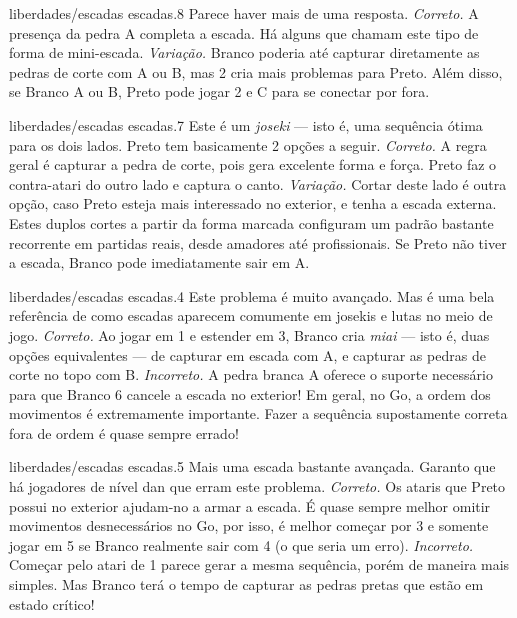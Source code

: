 \problemAnswerDiagram
  {liberdades/escadas}
  {escadas.8}
  {Parece haver mais de uma resposta.}
  {\emph{Correto.} A presença da pedra A completa a escada. Há alguns que chamam este tipo de forma de mini-escada.}
  {\emph{Variação.} Branco poderia até capturar diretamente as pedras de corte com A ou B, mas 2 cria mais problemas para Preto. Além disso, se Branco A ou B, Preto pode jogar 2 e C para se conectar por fora.}

\problemAnswerDiagram
  {liberdades/escadas}
  {escadas.7}
  {Este é um \emph{joseki} --- isto é, uma sequência ótima para os dois lados. Preto tem basicamente 2 opções a seguir.}
  {\emph{Correto.} A regra geral é capturar a pedra de corte, pois gera excelente forma e força. Preto faz o contra-atari do outro lado e captura o canto.}
  {\emph{Variação.} Cortar deste lado é outra opção, caso Preto esteja mais interessado no exterior, e tenha a escada externa. Estes duplos cortes a partir da forma marcada configuram um padrão bastante recorrente em partidas reais, desde amadores até profissionais. Se Preto não tiver a escada, Branco pode imediatamente sair em A.}

\problemAnswerDiagram
  {liberdades/escadas}
  {escadas.4}
  {Este problema é muito avançado. Mas é uma bela referência de como escadas aparecem comumente em josekis e lutas no meio de jogo.}
  {\emph{Correto.} Ao jogar em 1 e estender em 3, Branco cria  \emph{miai} --- isto é, duas opções equivalentes --- de capturar em escada com A, e capturar as pedras de corte no topo com B.}
  {\emph{Incorreto.} A pedra branca A oferece o suporte necessário para que Branco 6 cancele a escada no exterior! Em geral, no Go, a ordem dos movimentos é extremamente importante. Fazer a sequência supostamente correta fora de ordem é quase sempre errado!}

\problemAnswerDiagram
  {liberdades/escadas}
  {escadas.5}
  {Mais uma escada bastante avançada. Garanto que há jogadores de nível dan que erram este problema.}
  {\emph{Correto.} Os ataris que Preto possui no exterior ajudam-no a armar a escada. É quase sempre melhor omitir movimentos desnecessários no Go, por isso, é melhor começar por 3 e somente jogar em 5 se Branco realmente sair com 4 (o que seria um erro).}
  {\emph{Incorreto.} Começar pelo atari de 1 parece gerar a mesma sequência, porém de maneira mais simples. Mas Branco terá o tempo de capturar as pedras pretas que estão em estado crítico!}